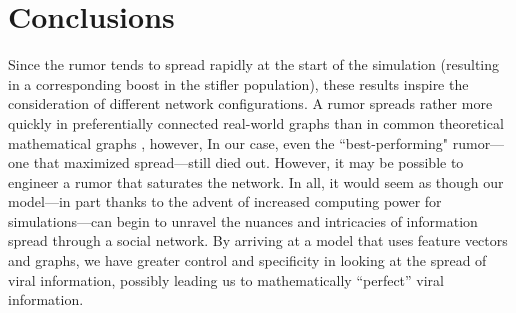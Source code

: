 \section{Conclusions}
\label{sec:conclusions}
Since the rumor tends to spread rapidly at the start of the simulation (resulting in a corresponding boost in the stifler population), these results inspire the consideration of different network configurations.  A rumor spreads rather more quickly in preferentially connected real-world graphs than in common theoretical mathematical graphs \cite{doerr-2012}, however, In our case, even the ``best-performing" rumor---one that maximized spread---still died out. However, it may be possible to engineer a rumor that saturates the network.
In all, it would seem as though our model---in part thanks to the advent of increased computing power for simulations---can begin to unravel the nuances and intricacies of information spread through a social network. By arriving at a model that uses feature vectors and graphs, we have greater control and specificity in looking at the spread of viral information, possibly leading us to mathematically ``perfect'' viral information.
